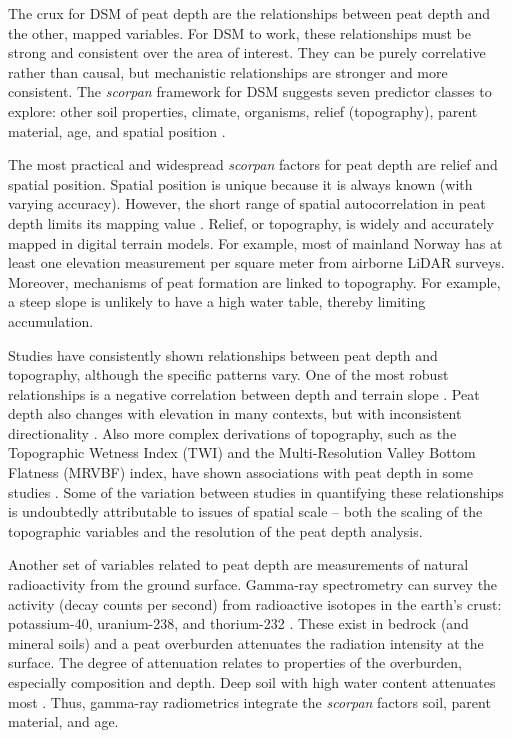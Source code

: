 \documentclass[soil, manuscript]{copernicus}
\begin{document}
The crux for DSM of peat depth are the relationships between peat depth and the other, mapped variables.
For DSM to work, these relationships must be strong and consistent over the area of interest.
They can be purely correlative rather than causal, but mechanistic relationships are stronger and more consistent.
The \emph{scorpan} framework for DSM suggests seven predictor classes to explore: other soil properties, climate, organisms, relief (topography), parent material, age, and spatial position \citep{mcbratneyDigitalSoilMapping2003}.

The most practical and widespread \emph{scorpan} factors for peat depth are relief and spatial position.
Spatial position is unique because it is always known (with varying accuracy).
However, the short range of spatial autocorrelation in peat depth limits its mapping value \citep{henglGenericFrameworkSpatial2004}.
Relief, or topography, is widely and accurately mapped in digital terrain models.
For example, most of mainland Norway has at least one elevation measurement per square meter from airborne LiDAR surveys.
Moreover, mechanisms of peat formation are linked to topography.
For example, a steep slope is unlikely to have a high water table, thereby limiting accumulation.

Studies have consistently shown relationships between peat depth and topography, although the specific patterns vary.
One of the most robust relationships is a negative correlation between depth and terrain slope \citep[e.g.][]{holdenEstimatingCarbonStock2011, parryMethodModellingPeat2012, gatisMappingUplandPeat2019}.
Peat depth also changes with elevation in many contexts, but with inconsistent directionality \citep[e.g.][]{holdenEstimatingCarbonStock2011, parryMethodModellingPeat2012, rudiyantoDigitalMappingCosteffective2016, rudiyantoOpenDigitalMapping2018, kogantiMappingPeatDepth2023, liFactorsControllingPeat2024}.
Also more complex derivations of topography, such as the Topographic Wetness Index (TWI) and the Multi-Resolution Valley Bottom Flatness (MRVBF) index, have shown associations with peat depth in some studies \citep[e.g.][]{rudiyantoOpenDigitalMapping2018, kogantiMappingPeatDepth2023, liFactorsControllingPeat2024}.
Some of the variation between studies in quantifying these relationships is undoubtedly attributable to issues of spatial scale -- both the scaling of the topographic variables and the resolution of the peat depth analysis.

Another set of variables related to peat depth are measurements of natural radioactivity from the ground surface.
Gamma-ray spectrometry can survey the activity (decay counts per second) from radioactive isotopes in the earth's crust: potassium-40, uranium-238, and thorium-232 \citep{reinhardtGammaraySpectrometryVersatile2019}.
These exist in bedrock (and mineral soils) and a peat overburden attenuates the radiation intensity at the surface.
The degree of attenuation relates to properties of the overburden, especially composition and depth.
Deep soil with high water content attenuates most \citep{beamishGammaRayAttenuation2013, reinhardtGammaraySpectrometryVersatile2019}.
Thus, gamma-ray radiometrics integrate the \emph{scorpan} factors soil, parent material, and age.
\end{document}
